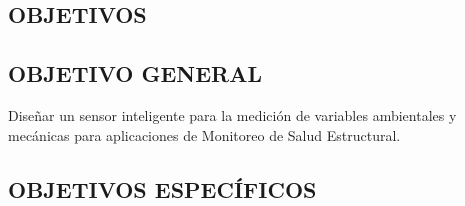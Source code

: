 \documentclass[12pt,letterpaper]{article}
\begin{document}


\newpage


\begin{center}
	\section*{OBJETIVOS}
\end{center}

\vspace{1cm}

\subsection*{OBJETIVO GENERAL}

Diseñar un sensor inteligente para la medición de variables ambientales y mecánicas para aplicaciones de Monitoreo de Salud Estructural.

\subsection*{OBJETIVOS ESPECÍFICOS}
\end{document}
